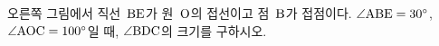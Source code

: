 \noindent\begin{minipage}[t]{0.58\linewidth}\vspace{0pt}\raggedright 오른쪽 그림에서 직선~$\mathrm{BE}$가 원~$\mathrm{O}$의 접선이고 점~$\mathrm{B}$가 접점이다. $\angle\mathrm{ABE}=30^\circ$, $\angle\mathrm{AOC}=100^\circ$일 때, $\angle\mathrm{BDC}$의 크기를 구하시오.\end{minipage}\hfill\begin{minipage}[t]{0.4\linewidth}\vspace{0pt}\centering \resizebox{\ifdim\width>\linewidth\linewidth\else\width\fi}{!}{}\end{minipage}\par
